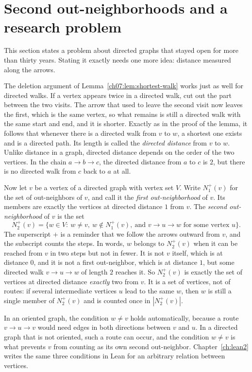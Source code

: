 \section{Second out-neighborhoods and a research problem}\label{ch07:sec:seymour}
This section states a problem about directed graphs that stayed open for more than thirty years. Stating it exactly needs one more idea: distance measured along the arrows.

The deletion argument of Lemma~\ref{ch07:lem:shortest-walk} works just as well for directed walks. If a vertex appears twice in a directed walk, cut out the part between the two visits. The arrow that used to leave the second visit now leaves the first, which is the same vertex, so what remains is still a directed walk with the same start and end, and it is shorter. Exactly as in the proof of the lemma, it follows that whenever there is a directed walk from $v$ to $w$, a shortest one exists and is a directed path. Its length is called the \emph{directed distance} from $v$ to $w$. Unlike distance in a graph, directed distance depends on the order of the two vertices. In the chain $a\to b\to c$, the directed distance from $a$ to $c$ is $2$, but there is no directed walk from $c$ back to $a$ at all.

Now let $v$ be a vertex of a directed graph with vertex set $V$. Write $N_1^+(v)$ for the set of out-neighbors of $v$, and call it the \emph{first out-neighborhood} of $v$. Its members are exactly the vertices at directed distance $1$ from $v$. The \emph{second out-neighborhood} of $v$ is the set
\[
N_2^+(v)=\{w\in V:\ w\ne v,\ w\notin N_1^+(v),\ \text{and }v\to u\to w\text{ for some vertex }u\}.
\]
The superscript $+$ is a reminder that we follow the arrows outward from $v$, and the subscript counts the steps. In words, $w$ belongs to $N_2^+(v)$ when it can be reached from $v$ in two steps but not in fewer. It is not $v$ itself, which is at distance $0$, and it is not a first out-neighbor, which is at distance $1$, but some directed walk $v\to u\to w$ of length $2$ reaches it. So $N_2^+(v)$ is exactly the set of vertices at directed distance \emph{exactly} two from $v$. It is a set of vertices, not of routes: if several intermediate vertices $u$ lead to the same $w$, then $w$ is still a single member of $N_2^+(v)$ and is counted once in $|N_2^+(v)|$.

In an oriented graph, the condition $w\ne v$ holds automatically, because a route $v\to u\to v$ would need edges in both directions between $v$ and $u$. In a directed graph that is not oriented, such a route can occur, and the condition $w\ne v$ is what prevents $v$ from counting as its own second out-neighbor. Chapter~\ref{ch:lean2} writes the same three conditions in Lean for an arbitrary relation between vertices.

